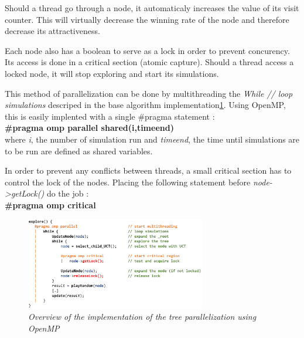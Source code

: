 Should a thread go through a node, it automaticaly increases the value of its visit counter. This will virtually decrease the winning rate of the node and therefore decrease its attractiveness.

Each node also has a boolean to serve as a lock in order to prevent concurency. Its access is done in a critical section (atomic capture). Should a thread access a locked node, it will stop exploring and start its simulations.

This method of parallelization can be done by multithreading the \textit{While // loop simulations} descriped in the base algorithm implementation\ref{fig:MCTSAlgorithmOMP}. Using OpenMP, this is easily implented with a single \#pragma statement :\\
\textbf{\#pragma omp parallel shared(i,timeend)}\\
where \textit{i}, the number of simulation run and \textit{timeend}, the time until simulations are to be run are defined as shared variables.

In order to prevent any conflicts between threads, a small critical section has to control the lock of the nodes. Placing the following statement before \textit{node->getLock()} do the job :\\
\textbf{\#pragma omp critical}

\begin{figure}[H]
\centerline{\includegraphics[width=0.7\textwidth]{Parallelisation/Computer/Img/omp.png}}
\caption{\label{fig:MCTSAlgorithmOMP}\textit{Overview of the implementation of the tree parallelization using OpenMP}}
\end{figure}
